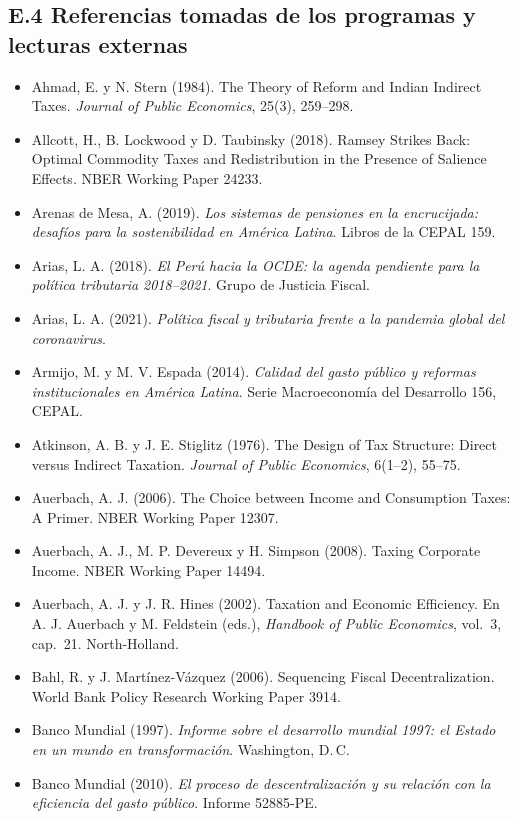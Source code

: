 \documentclass[11pt,a4paper]{article}
\begin{document}
\subsection*{E.4 Referencias tomadas de los programas y lecturas externas}
{\small
\begin{itemize}[leftmargin=1.4em,itemsep=1pt,label={}]
\item Ahmad, E. y N. Stern (1984). The Theory of Reform and Indian Indirect Taxes. \emph{Journal of Public Economics}, 25(3), 259--298.
\item Allcott, H., B. Lockwood y D. Taubinsky (2018). Ramsey Strikes Back: Optimal Commodity Taxes and Redistribution in the Presence of Salience Effects. NBER Working Paper 24233.
\item Arenas de Mesa, A. (2019). \emph{Los sistemas de pensiones en la encrucijada: desafíos para la sostenibilidad en América Latina}. Libros de la CEPAL 159.
\item Arias, L. A. (2018). \emph{El Perú hacia la OCDE: la agenda pendiente para la política tributaria 2018--2021}. Grupo de Justicia Fiscal.
\item Arias, L. A. (2021). \emph{Política fiscal y tributaria frente a la pandemia global del coronavirus}.
\item Armijo, M. y M. V. Espada (2014). \emph{Calidad del gasto público y reformas institucionales en América Latina}. Serie Macroeconomía del Desarrollo 156, CEPAL.
\item Atkinson, A. B. y J. E. Stiglitz (1976). The Design of Tax Structure: Direct versus Indirect Taxation. \emph{Journal of Public Economics}, 6(1--2), 55--75.
\item Auerbach, A. J. (2006). The Choice between Income and Consumption Taxes: A Primer. NBER Working Paper 12307.
\item Auerbach, A. J., M. P. Devereux y H. Simpson (2008). Taxing Corporate Income. NBER Working Paper 14494.
\item Auerbach, A. J. y J. R. Hines (2002). Taxation and Economic Efficiency. En A. J. Auerbach y M. Feldstein (eds.), \emph{Handbook of Public Economics}, vol.~3, cap.~21. North-Holland.
\item Bahl, R. y J. Martínez-Vázquez (2006). Sequencing Fiscal Decentralization. World Bank Policy Research Working Paper 3914.
\item Banco Mundial (1997). \emph{Informe sobre el desarrollo mundial 1997: el Estado en un mundo en transformación}. Washington, D.\,C.
\item Banco Mundial (2010). \emph{El proceso de descentralización y su relación con la eficiencia del gasto público}. Informe 52885-PE.

\end{itemize}}
\end{document}

